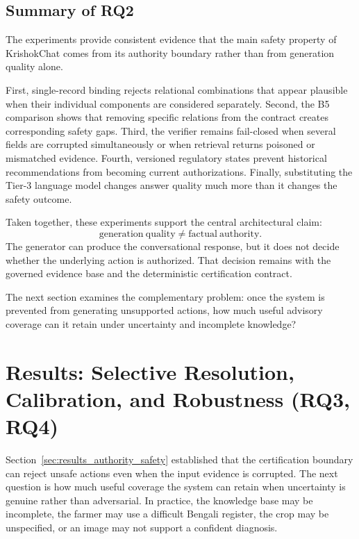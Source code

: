 \documentclass[a4paper,fleqn]{cas-dc}
\begin{document}
\subsection{Summary of RQ2}

The experiments provide consistent evidence that the main safety property of KrishokChat comes from its authority boundary rather than from generation quality alone.

First, single-record binding rejects relational combinations that appear plausible when their individual components are considered separately. Second, the B5 comparison shows that removing specific relations from the contract creates corresponding safety gaps. Third, the verifier remains fail-closed when several fields are corrupted simultaneously or when retrieval returns poisoned or mismatched evidence. Fourth, versioned regulatory states prevent historical recommendations from becoming current authorizations. Finally, substituting the Tier-3 language model changes answer quality much more than it changes the safety outcome.

Taken together, these experiments support the central architectural claim:
\begin{equation}
\mathrm{generation\ quality} \neq \mathrm{factual\ authority}.
\end{equation}
The generator can produce the conversational response, but it does not decide whether the underlying action is authorized. That decision remains with the governed evidence base and the deterministic certification contract.

The next section examines the complementary problem: once the system is prevented from generating unsupported actions, how much useful advisory coverage can it retain under uncertainty and incomplete knowledge?


\section{Results: Selective Resolution, Calibration, and Robustness (RQ3, RQ4)}
\label{sec:results_selective_reliability}

Section~\ref{sec:results_authority_safety} established that the certification boundary can reject unsafe actions even when the input evidence is corrupted. The next question is how much useful coverage the system can retain when uncertainty is genuine rather than adversarial. In practice, the knowledge base may be incomplete, the farmer may use a difficult Bengali register, the crop may be unspecified, or an image may not support a confident diagnosis.
\end{document}
